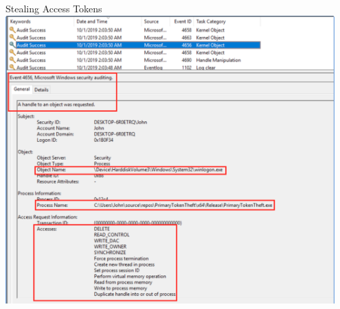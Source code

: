 \documentclass[nobackground,dvipsnames,table]{beamer}
\begin{document}
\begin{frame}{Stealing Access Tokens}
    \includegraphics[width=0.95\textwidth]{stealing-access-tokens}
\end{frame}
\end{document}
